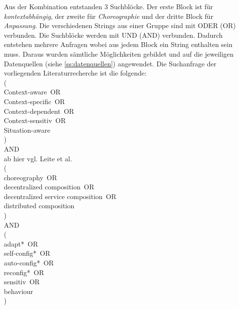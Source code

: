 \documentclass[conference,compsoc,ngerman]{IEEEtran}
\begin{document}
Aus der Kombination entstanden 3 Suchblöcke. Der erste Block ist für \textit{kontextabhängig}, der zweite für \textit{Choreographie} und der dritte Block für \textit{Anpassung}. Die verschiedenen Strings aus einer Gruppe sind mit ODER (OR) verbunden. Die Suchblöcke werden mit UND (AND) verbunden. Dadurch entstehen mehrere Anfragen wobei aus jedem Block ein String enthalten sein muss. Daraus wurden sämtliche Möglichkeiten gebildet und auf die jeweiligen Datenquellen (siehe \cref{ss:datenquellen}) angewendet. 
Die Suchanfrage der vorliegenden Literaturrecherche ist die folgende:\\
(\\
	\glqq Context-aware\grqq~OR\\
	\glqq Context-specific\grqq~OR\\
	\glqq Context-dependent\grqq~OR\\
	\glqq Context-sensitiv\grqq~OR\\
	\glqq Situation-aware\grqq \\
)\\
AND\\
ab hier vgl. Leite et al.~\cite{leite2013systematic} \\
 (\\
\glqq choreography\grqq~OR\\
\glqq decentralized composition\grqq~OR\\
\glqq decentralized service composition\grqq~OR\\
\glqq distributed composition\grqq\\
) \\
AND\\
(\\
\glqq adapt*\grqq~OR\\
\glqq self-config*\grqq~OR\\
\glqq auto-config*\grqq~OR\\
\glqq reconfig*\grqq~OR\\
\glqq sensitiv\grqq~OR\\
\glqq behaviour\grqq\\
)\\
\end{document}
